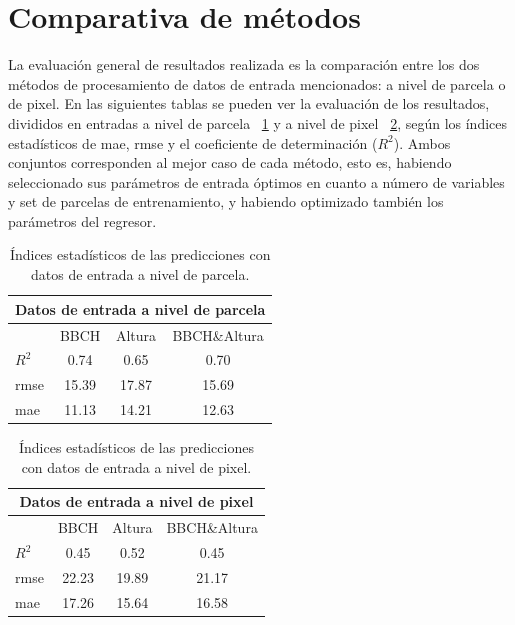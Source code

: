\section{Comparativa de métodos}
\par La evaluación general de resultados realizada es la comparación entre los dos métodos de procesamiento de datos de entrada mencionados: a nivel de parcela o de pixel. En las siguientes tablas se pueden ver la evaluación de los resultados, divididos en entradas a nivel de parcela ~\ref{tab:errorpc} y a nivel de pixel ~\ref{tab:errorpx}, según los índices estadísticos de \gls{mae}, \gls{rmse} y el coeficiente de determinación ($R^2$). Ambos conjuntos corresponden al mejor caso de cada método, esto es, habiendo seleccionado sus parámetros de entrada óptimos en cuanto a número de variables y set de parcelas de entrenamiento, y habiendo optimizado también los parámetros del regresor.

\begin{table}[h]
\centering
\begin{tabular}{lccc}
\multicolumn{4}{c}{Datos de entrada a nivel de parcela}                            \\ \hline \hline
\multicolumn{1}{l|}{}                            & BBCH  & Altura & BBCH\&Altura \\ \cline{2-4} 
\multicolumn{1}{l|}{$R^2$}                       & 0.74  & 0.65   & 0.70 \\
\multicolumn{1}{l|}{\gls{rmse}} 				 & 15.39 & 17.87  & 15.69 \\
\multicolumn{1}{l|}{\gls{mae}}  				 & 11.13 & 14.21  & 12.63       
\end{tabular}
\caption{Índices estadísticos de las predicciones con datos de entrada a nivel de parcela. \label{tab:errorpc}}
\end{table}

\begin{table}[h]
\centering
\begin{tabular}{lccc}
\multicolumn{4}{c}{Datos de entrada a nivel de pixel}                            \\ \hline \hline
\multicolumn{1}{l|}{}                            & BBCH  & Altura & BBCH\&Altura \\ \cline{2-4} 
\multicolumn{1}{l|}{$R^2$}                       & 0.45  & 0.52   & 0.45         \\
\multicolumn{1}{l|}{\gls{rmse}} 				 & 22.23 & 19.89  & 21.17        \\
\multicolumn{1}{l|}{\gls{mae}}  				 & 17.26 & 15.64  & 16.58       
\end{tabular}
\caption{Índices estadísticos de las predicciones con datos de entrada a nivel de pixel.\label{tab:errorpx}}
\end{table}

